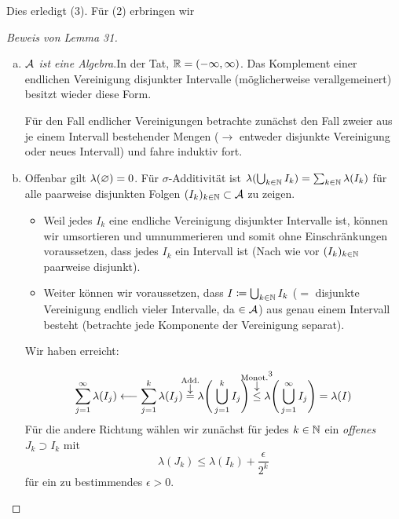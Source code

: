 \documentclass[skript.tex]{subfiles}
\begin{document}
		Dies erledigt (3). Für (2) erbringen wir
		\begin{proof}[Beweis von Lemma 31]
			\hfill %
			\begin{enumerate}[(a)]
				\item \emph{$\mathcal{A}$ ist eine Algebra}.\quad In der Tat, $\mathbb{R} = (-\infty,\infty)$.
					Das Komplement einer endlichen Vereinigung disjunkter Intervalle
					(möglicherweise verallgemeinert) besitzt wieder diese Form.
					
					Für den Fall endlicher Vereinigungen betrachte zunächst den Fall zweier aus je
					einem Intervall bestehender Mengen ($\rightarrow$ entweder disjunkte
					Vereinigung oder neues Intervall) und fahre induktiv fort.
				\item Offenbar gilt $\lambda(\varnothing) = 0$. Für $\sigma$-Additivität ist
					$\lambda(\bigcup_{k\in\mathbb{N}} I_k) = \sum_{k\in\mathbb{N}} \lambda(I_k)$ für alle paarweise
					disjunkten Folgen $(I_k)_{k\in\mathbb{N}} \subset \mathcal{A}$ zu zeigen.
					
					\begin{itemize}
						\item Weil jedes $I_k$ eine endliche Vereinigung disjunkter Intervalle ist,
							können wir umsortieren und umnummerieren und somit ohne
							Einschränkungen voraussetzen, dass jedes $I_k$ ein Intervall ist
							(Nach wie vor $(I_k)_{k\in\mathbb{N}}$ paarweise disjunkt).
						\item Weiter können wir voraussetzen, dass $I \coloneqq \bigcup_{k\in\mathbb{N}} I_k$
							($=$ disjunkte Vereinigung endlich vieler Intervalle, da $\in \mathcal{A}$)
							aus genau einem Intervall besteht (betrachte jede Komponente der
							Vereinigung separat).
					\end{itemize}
					Wir haben erreicht:
					\addtocounter{footnote}{-2}
					\[
						\sum_{j=1}^\infty \lambda(I_j) \longleftarrow \sum_{j=1}^k \lambda(I_j)
						\darrow{\text{Add.}}{=} \lambda{\Bigg( \bigcup_{j=1}^k I_j \Bigg)}
						\darrow{\text{Monot.}\footnotemark}{\leq}
						\lambda{\Bigg( \bigcup_{j=1}^\infty I_j \Bigg)} = \lambda(I)
					\]
					Für die andere Richtung wählen wir zunächst für jedes $k\in\mathbb{N}$ ein 
					\emph{offenes} $J_k \supset I_k$ mit
					\[
						\lambda(J_k) \leq \lambda(I_k) + \frac{\epsilon}{2^k}
					\]
					für ein zu bestimmendes $\epsilon > 0$.
					

\end{enumerate}
\end{proof}
\end{document}
